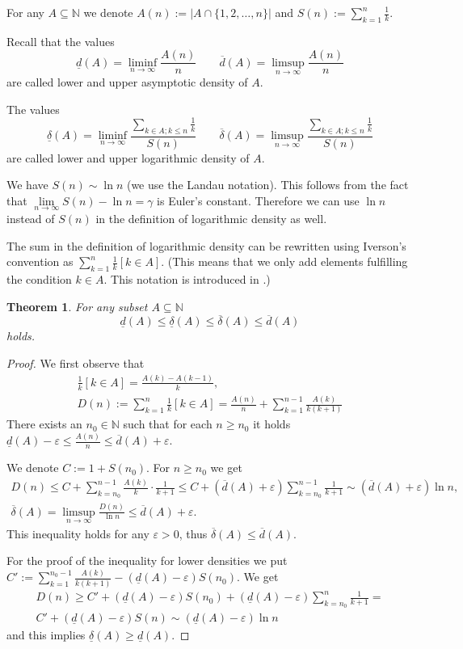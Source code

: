 \documentclass[12pt]{article}
\newcommand{\N}[0]{\mathbb{N}}
\newcommand*{\abs}[1]{| #1 |}
\newcommand{\ve}{\varepsilon}
\newcommand{\ol}[1]{\overline{#1}}
\newcommand{\ul}[1]{\underline{#1}}
\newcommand{\limti}[1]{\lim\limits_{#1\to\infty}}
\newtheorem{THM}{Theorem}
\begin{document}
For any $A\subseteq\N$ we denote
$A(n):=\abs{A\cap\{1,2,\ldots,n\}}$ and $S(n):=\sum\limits_{k=1}^n
\frac 1k$.

Recall that the values
$$\ul d(A)=\liminf_{n\to\infty} \frac{A(n)}n \qquad \ol d(A) = \limsup_{n\to\infty} \frac{A(n)}n$$
are called lower and upper asymptotic density of $A$.

The values
$$\ul \delta(A)=\liminf_{n\to\infty} \frac{\sum\limits_{k\in A; k\leq n} \frac 1k}{S(n)} \qquad \ol \delta(A) = \limsup_{n\to\infty}
\frac{\sum\limits_{k\in A; k\leq n} \frac 1k}{S(n)}$$ are called
lower and upper logarithmic density of $A$.

We have $S(n)\sim \ln n$ (we use the Landau notation). This
follows from the fact that $\limti n S(n)-\ln n=\gamma$ is Euler's
constant. Therefore we can use $\ln n$ instead of $S(n)$ in the
definition of logarithmic density as well.

The sum in the definition of logarithmic density can be rewritten
using Iverson's convention as $\sum_{k=1}^n \frac 1k [k\in A]$.
(This means that we only add elements fulfilling the condition
$k\in A$. This notation is introduced in \cite[p.24]{knuth}.)

\begin{THM}
For any subset $A\subseteq\N$ 
$$\ul d(A) \leq \ul \delta (A) \leq \ol \delta(A) \leq \ol d(A)$$
holds.
\end{THM}

\begin{proof}
We first observe that
\begin{gather*}
\frac 1k [k\in A]=\frac{A(k)-A(k-1)}k,\\
D(n):=\sum_{k=1}^n \frac 1k [k\in A] = \frac{A(n)}n+
\sum_{k=1}^{n-1} \frac{A(k)}{k(k+1)}
\end{gather*}
There exists an $n_0\in\N$ such that for each $n\geq n_0$ it holds
$\ul d(A)-\ve \leq \frac{A(n)}n \leq \ol d(A) + \ve$.

We denote $C:=1+S(n_0)$. For $n\geq n_0$ we get
\begin{gather*}
D(n) \leq C + \sum_{k=n_0}^{n-1} \frac{A(k)}k\cdot \frac 1{k+1}
\leq C + (\ol d(A)+\ve) \sum_{k=n_0}^{n-1} \frac 1{k+1} \sim (\ol
d(A)+\ve) \ln n,\\
\ol\delta(A)=\limsup_{n\to\infty} \frac{D(n)}{\ln n} \leq \ol
d(A)+\ve.
\end{gather*}
This inequality holds for any $\ve>0$, thus $\ol\delta(A)\leq \ol
d(A)$.

For the proof of the inequality for lower densities we put
$C':=\sum_{k=1}^{n_0-1} \frac{A(k)}{k(k+1)}-(\ul d(A)-\ve)S(n_0)$.
We get
\begin{multline*}
D(n)\geq C' + (\ul d(A)-\ve)S(n_0) + (\ul d(A)-\ve) \sum_{k=n_0}^n
\frac1{k+1} =\\ C'+(\ul d(A)-\ve)S(n) \sim (\ul d(A)-\ve)\ln n
\end{multline*}
and this implies $\ul\delta(A)\geq\ul d(A)$.
\end{proof}
\end{document}
